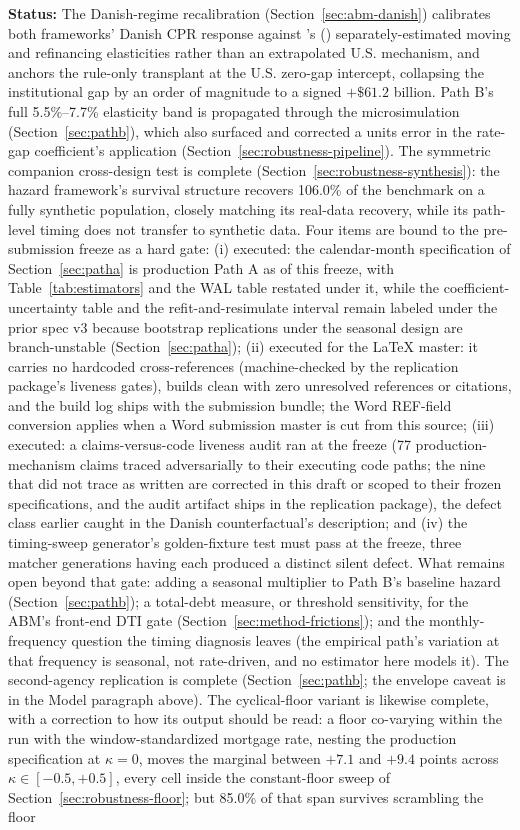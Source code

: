 \documentclass[12pt]{article}
\newcommand{\citepos}[1]{\citeauthor{#1}'s (\citeyear{#1})}
\begin{document}
\textbf{Status:} The Danish-regime recalibration (Section~\ref{sec:abm-danish}) calibrates both frameworks' Danish CPR response against \citepos{berger2026} separately-estimated moving and refinancing elasticities rather than an extrapolated U.S. mechanism, and anchors the rule-only transplant at the U.S. zero-gap intercept, collapsing the institutional gap by an order of magnitude to a signed $+\$61.2$ billion. Path B's full 5.5\%--7.7\% elasticity band is propagated through the microsimulation (Section~\ref{sec:pathb}), which also surfaced and corrected a units error in the rate-gap coefficient's application (Section~\ref{sec:robustness-pipeline}). The symmetric companion cross-design test is complete (Section~\ref{sec:robustness-synthesis}): the hazard framework's survival structure recovers 106.0\% of the benchmark on a fully synthetic population, closely matching its real-data recovery, while its path-level timing does not transfer to synthetic data. Four items are bound to the pre-submission freeze as a hard gate: (i) executed: the calendar-month specification of Section~\ref{sec:patha} is production Path A as of this freeze, with Table~\ref{tab:estimators} and the WAL table restated under it, while the coefficient-uncertainty table and the refit-and-resimulate interval remain labeled under the prior spec v3 because bootstrap replications under the seasonal design are branch-unstable (Section~\ref{sec:patha}); (ii) executed for the LaTeX master: it carries no hardcoded cross-references (machine-checked by the replication package's liveness gates), builds clean with zero unresolved references or citations, and the build log ships with the submission bundle; the Word REF-field conversion applies when a Word submission master is cut from this source; (iii) executed: a claims-versus-code liveness audit ran at the freeze (77 production-mechanism claims traced adversarially to their executing code paths; the nine that did not trace as written are corrected in this draft or scoped to their frozen specifications, and the audit artifact ships in the replication package), the defect class earlier caught in the Danish counterfactual's description; and (iv) the timing-sweep generator's golden-fixture test must pass at the freeze, three matcher generations having each produced a distinct silent defect. What remains open beyond that gate: adding a seasonal multiplier to Path B's baseline hazard (Section~\ref{sec:pathb}); a total-debt measure, or threshold sensitivity, for the ABM's front-end DTI gate (Section~\ref{sec:method-frictions}); and the monthly-frequency question the timing diagnosis leaves (the empirical path's variation at that frequency is seasonal, not rate-driven, and no estimator here models it). The second-agency replication is complete (Section~\ref{sec:pathb}; the envelope caveat is in the Model paragraph above). The cyclical-floor variant is likewise complete, with a correction to how its output should be read: a floor co-varying within the run with the window-standardized mortgage rate, nesting the production specification at $\kappa = 0$, moves the marginal between $+7.1$ and $+9.4$ points across $\kappa \in [-0.5, +0.5]$, every cell inside the constant-floor sweep of Section~\ref{sec:robustness-floor}; but 85.0\% of that span survives scrambling the floor 
\end{document}
